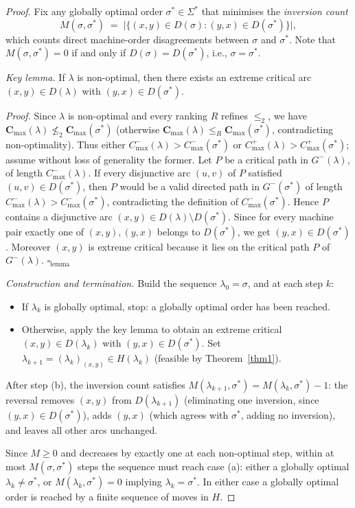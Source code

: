 \documentclass[preprint,12pt]{elsarticle}
\begin{document}
\begin{proof}
Fix any globally optimal order $\sigma^*\in\Sigma^*$ that minimises the \emph{inversion count}
\[
  M(\sigma,\sigma^*) \;=\; \bigl|\{(x,y)\in D(\sigma) : (y,x)\in D(\sigma^*)\}\bigr|,
\]
which counts direct machine-order disagreements between $\sigma$ and $\sigma^*$.
Note that $M(\sigma,\sigma^*)=0$ if and only if $D(\sigma)=D(\sigma^*)$, i.e., $\sigma=\sigma^*$.

\medskip
\noindent\textit{Key lemma.}
If $\lambda$ is non-optimal, then there exists an extreme critical arc $(x,y)\in D(\lambda)$ with $(y,x)\in D(\sigma^*)$.

\noindent\textit{Proof.}
Since $\lambda$ is non-optimal and every ranking $R$ refines $\le_2$, we have
$\mathbf{C}_{\max}(\lambda)\not\le_2 \mathbf{C}_{\max}(\sigma^*)$
(otherwise $\mathbf{C}_{\max}(\lambda)\le_R\mathbf{C}_{\max}(\sigma^*)$, contradicting non-optimality).
Thus either $C^-_{\max}(\lambda)>C^-_{\max}(\sigma^*)$ or $C^+_{\max}(\lambda)>C^+_{\max}(\sigma^*)$;
assume without loss of generality the former.
Let $P$ be a critical path in $G^-(\lambda)$, of length $C^-_{\max}(\lambda)$.
If every disjunctive arc $(u,v)$ of $P$ satisfied $(u,v)\in D(\sigma^*)$, then $P$ would be a valid directed path in $G^-(\sigma^*)$ of length $C^-_{\max}(\lambda)>C^-_{\max}(\sigma^*)$, contradicting the definition of $C^-_{\max}(\sigma^*)$.
Hence $P$ contains a disjunctive arc $(x,y)\in D(\lambda)\setminus D(\sigma^*)$.
Since for every machine pair exactly one of $(x,y),(y,x)$ belongs to $D(\sigma^*)$, we get $(y,x)\in D(\sigma^*)$.
Moreover $(x,y)$ is extreme critical because it lies on the critical path $P$ of $G^-(\lambda)$. \hfill$\square_{\text{lemma}}$

\medskip
\noindent\textit{Construction and termination.}
Build the sequence $\lambda_0=\sigma$, and at each step $k$:
\begin{itemize}
\item[(a)] If $\lambda_k$ is globally optimal, stop: a globally optimal order has been reached.
\item[(b)] Otherwise, apply the key lemma to obtain an extreme critical $(x,y)\in D(\lambda_k)$ with $(y,x)\in D(\sigma^*)$.
Set $\lambda_{k+1}=(\lambda_k)_{(x,y)}\in H(\lambda_k)$ (feasible by Theorem~\ref{thm1}).
\end{itemize}
After step (b), the inversion count satisfies $M(\lambda_{k+1},\sigma^*)=M(\lambda_k,\sigma^*)-1$:
the reversal removes $(x,y)$ from $D(\lambda_{k+1})$ (eliminating one inversion, since $(y,x)\in D(\sigma^*)$),
adds $(y,x)$ (which agrees with $\sigma^*$, adding no inversion),
and leaves all other arcs unchanged.

Since $M\ge 0$ and decreases by exactly one at each non-optimal step, within at most $M(\sigma,\sigma^*)$ steps the sequence must reach case (a): either a globally optimal $\lambda_k\ne\sigma^*$,
or $M(\lambda_k,\sigma^*)=0$ implying $\lambda_k=\sigma^*$.
In either case a globally optimal order is reached by a finite sequence of moves in $H$.
\end{proof}
\end{document}
